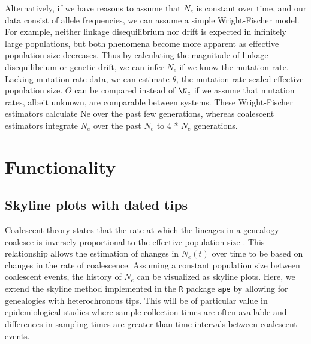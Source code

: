 \documentclass[english,titlepage]{article}
\begin{document}
Alternatively, if we have reasons to assume that $N_{e}$ is constant over time, and our data consist of allele frequencies, we can assume a simple Wright-Fischer model. For example, neither linkage disequilibrium nor drift is expected in infinitely large populations, but both phenomena become more apparent as effective population size decreases. Thus by calculating the magnitude of linkage disequilibrium or genetic drift, we can infer $N_{e}$ if we know the mutation rate. Lacking mutation rate data, we can estimate $\theta$,  the mutation-rate scaled effective population size. $\Theta$ can be compared instead of $\N_{e}$ if we assume that mutation rates, albeit unknown, are comparable between systems. These Wright-Fischer estimators calculate Ne over the past few generations, whereas coalescent estimators integrate $N_e$ over the past $N_e$ to 4 * $N_e$ generations.



\section*{Functionality}
\subsection*{Skyline plots with dated tips}

Coalescent theory states that the rate at which the lineages in a genealogy coalesce is inversely proportional to the effective population size \citep{Kingman1982} \citep{slatkin_pairwise_1991}. This relationship allows the estimation of changes in $N_e(t)$ over time to be based on changes in the rate of coalescence. Assuming a constant population size between coalescent events, the history of $N_e$ can be visualized as skyline plots. Here, we extend the skyline method implemented in the \texttt{R} package \texttt{ape} \citep{Paradis2004} by allowing for genealogies with heterochronous tips. This will be of particular value in epidemiological studies where sample collection times are often available and differences in sampling times are greater than time intervals between coalescent events. 
\end{document}

